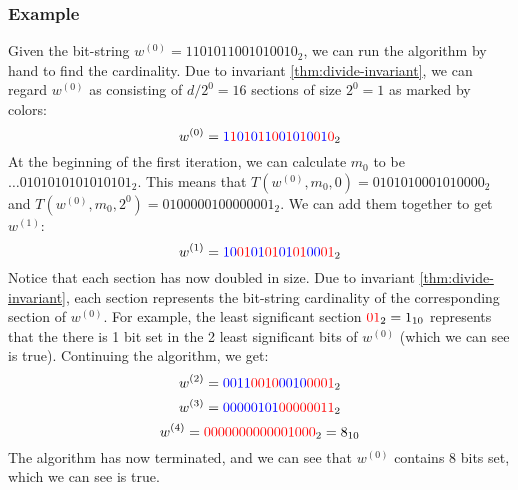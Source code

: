 \subsubsection{Example}
Given the bit-string $w^{(0)}=1101011001010010_2$, we can run the algorithm by hand to find the cardinality. Due to invariant \ref{thm:divide-invariant}, we can regard $w^{(0)}$ as consisting of $d/2^0=16$ sections of size $2^0=1$ as marked by colors:\\
$$w^{(0)}=\color{blue}1\color{red}1\color{blue}0\color{red}1\color{blue}0\color{red}1\color{blue}1\color{red}0\color{blue}0\color{red}1\color{blue}0\color{red}1\color{blue}0\color{red}0\color{blue}1\color{red}0_{\color{black}2}$$
At the beginning of the first iteration, we can calculate $m_0$ to be $\dots0101010101010101_2$. This means that $T(w^{(0)}, m_0, 0)=0101010001010000_2$ and $T(w^{(0)}, m_0, 2^0)=0100000100000001_2$.
We can add them together to get $w^{(1)}$:
$$w^{(1)}=\color{blue}10\color{red}01\color{blue}01\color{red}01\color{blue}01\color{red}01\color{blue}00\color{red}01_{\color{black}2}$$
Notice that each section has now doubled in size. Due to invariant \ref{thm:divide-invariant}, each section represents the bit-string cardinality of the corresponding section of $w^{(0)}$. For example, the least significant section $\color{red}01\color{black}_2 = 1_{10}$ represents that the there is 1 bit set in the 2 least significant bits of $w^{(0)}$ (which we can see is true). Continuing the algorithm, we get:
$$w^{(2)}=\color{blue}0011\color{red}0010\color{blue}0010\color{red}0001\color{black}_2$$
$$w^{(3)}=\color{blue}00000101\color{red}00000011\color{black}_2$$
$$w^{(4)}=\color{red}0000000000001000\color{black}_2 = 8_{10}$$
The algorithm has now terminated, and we can see that $w^{(0)}$ contains 8 bits set, which we can see is true.

% 
